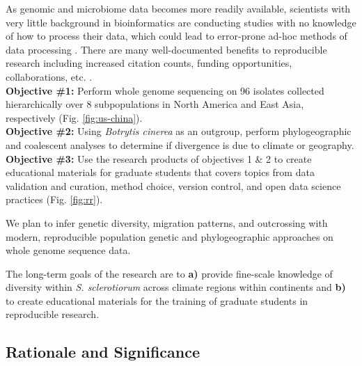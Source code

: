 \documentclass[12pt,letterpaper]{article}
\begin{document}
As genomic and microbiome data becomes more readily available, scientists with very little background in bioinformatics are conducting studies with no knowledge of how to process their data, which could lead to error-prone ad-hoc methods of data processing \citep{stewart-lowndes2017path,barone2017unmet}. 
There are many well-documented benefits to reproducible research including increased citation counts, funding opportunities, collaborations, etc. \citep{mckiernan2016open,stewart-lowndes2017path}.\\
\textbf{Objective \#1:} Perform whole genome sequencing on 96 isolates collected hierarchically over 8 subpopulations in North America and East Asia, respectively (Fig. \ref{fig:us-china}).\\
\textbf{Objective \#2:} Using \textit{Botrytis cinerea} as an outgroup, perform phylogeographic and coalescent analyses to determine if divergence is due to climate or geography.\\
\textbf{Objective \#3:} Use the research products of objectives 1 \& 2 to create educational materials for graduate students that covers topics from
data validation and curation, method choice, version control, and open data science practices (Fig. \ref{fig:rr}).

We plan to infer genetic diversity, migration patterns, and outcrossing with modern, reproducible population genetic and phylogeographic approaches on whole genome sequence data. 

The long-term goals of the research are to \textbf{a)} provide fine-scale knowledge of diversity within \textit{S. sclerotiorum} across climate regions within continents and \textbf{b)} to create educational materials for the training of graduate students in reproducible research. 




\subsection{Rationale and Significance}



\end{document}
